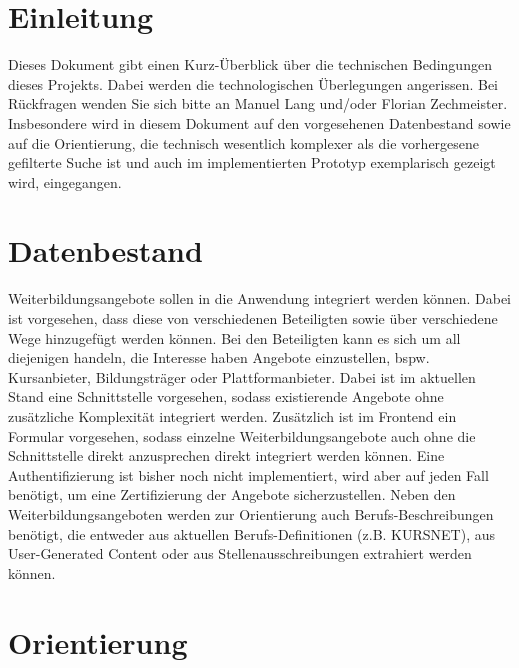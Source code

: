 \documentclass[10pt]{article}
\begin{document}
\maketitle

\section{Einleitung}

Dieses Dokument gibt einen Kurz-Überblick über die technischen Bedingungen
dieses Projekts. Dabei werden die technologischen Überlegungen angerissen. Bei
Rückfragen wenden Sie sich bitte an Manuel Lang und/oder Florian Zechmeister.
Insbesondere wird in diesem Dokument auf den vorgesehenen Datenbestand sowie
auf die Orientierung, die technisch wesentlich komplexer als die vorhergesene
gefilterte Suche ist und auch im implementierten Prototyp exemplarisch gezeigt
wird, eingegangen.

\section{Datenbestand}

Weiterbildungsangebote sollen in die Anwendung integriert werden können. Dabei
ist vorgesehen, dass diese von verschiedenen Beteiligten sowie über verschiedene
Wege hinzugefügt werden können. Bei den Beteiligten kann es sich um all
diejenigen handeln, die Interesse haben Angebote einzustellen, bspw.
Kursanbieter, Bildungsträger oder Plattformanbieter. Dabei ist im aktuellen
Stand eine Schnittstelle vorgesehen, sodass existierende Angebote ohne
zusätzliche Komplexität integriert werden. Zusätzlich ist im Frontend ein
Formular vorgesehen, sodass einzelne Weiterbildungsangebote auch ohne die
Schnittstelle direkt anzusprechen direkt integriert werden können. Eine
Authentifizierung ist bisher noch nicht implementiert, wird aber auf jeden Fall
benötigt, um eine Zertifizierung der Angebote sicherzustellen. Neben den
Weiterbildungsangeboten werden zur Orientierung auch Berufs-Beschreibungen
benötigt, die entweder aus aktuellen Berufs-Definitionen (z.B. KURSNET), aus
User-Generated Content oder aus Stellenausschreibungen extrahiert werden können.

\section{Orientierung}
\end{document}
